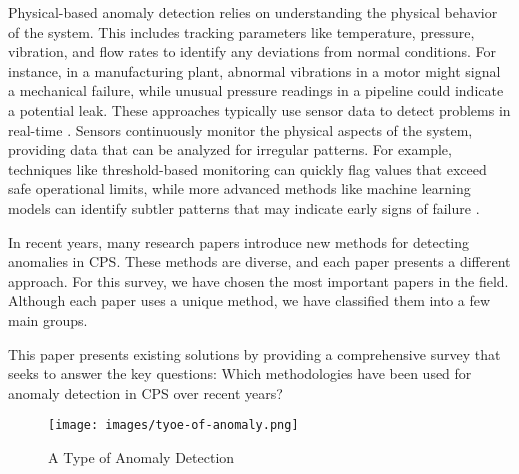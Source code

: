 Physical-based anomaly detection relies on understanding the physical behavior of the system. This includes tracking parameters like temperature, pressure, vibration, and flow rates to identify any deviations from normal conditions. For instance, in a manufacturing plant, abnormal vibrations in a motor might signal a mechanical failure, while unusual pressure readings in a pipeline could indicate a potential leak. These approaches typically use sensor data to detect problems in real-time \cite{142,143,144}. Sensors continuously monitor the physical aspects of the system, providing data that can be analyzed for irregular patterns. For example, techniques like threshold-based monitoring can quickly flag values that exceed safe operational limits, while more advanced methods like machine learning models can identify subtler patterns that may indicate early signs of failure \cite{145,146}.

In recent years, many research papers\cite{15,16,17,18} introduce new methods for detecting anomalies in CPS. These methods are diverse, and each paper presents a different approach. For this survey, we have chosen the most important papers in the field. Although each paper uses a unique method, we have classified them into a few main groups.

This paper presents existing solutions by providing a comprehensive survey that seeks to answer the key questions: Which methodologies have been used for anomaly detection in CPS over recent years? 

\begin{figure}[h]
    \centering
    \texttt{[image: images/tyoe-of-anomaly.png]}
    \caption{A Type of Anomaly Detection}
    \label{fig:test_file}
\end{figure}

